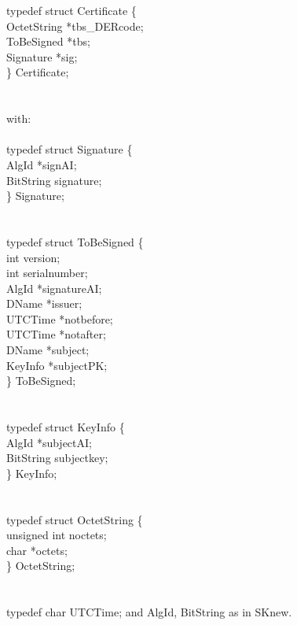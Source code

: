 {\small
\bvtab
\4      typedef struct Certificate \{  \\
\6              OctetString   \4 *tbs\_DERcode; \\
\6              ToBeSigned    \4 *tbs; \\
\6              Signature     \4 *sig; \\
\4      \} Certificate;  \\ \\ \\
with: \\ \\
\4      typedef struct Signature \{  \\
\6              AlgId         \3 *signAI; \\
\6              BitString     \3 signature; \\
\4 \}           Signature;  \\ \\ \\
\4      typedef struct ToBeSigned \{ \\
\6              int           \3 version; \\
\6              int           \3 serialnumber; \\
\6              AlgId         \3 *signatureAI; \\
\6              DName          \3 *issuer; \\
\6              UTCTime       \3 *notbefore; \\
\6              UTCTime       \3 *notafter; \\
\6              DName          \3 *subject; \\
\6              KeyInfo       \3 *subjectPK; \\
\4      \} ToBeSigned;  \\ \\ \\
\4      typedef struct KeyInfo \{  \\
\6              AlgId         \3 *subjectAI; \\
\6              BitString     \3 subjectkey; \\
\4      \} KeyInfo; \\ \\ \\
\4      typedef struct OctetString \{ \\
\6              unsigned int  \3 noctets; \\
\6              char          \3 *octets; \\
\4      \} OctetString;  \\ \\ \\
\4      typedef char UTCTime;
\evtab
}
and AlgId, BitString as in SKnew.

